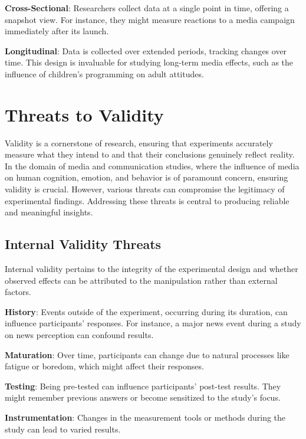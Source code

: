 \documentclass[
  b5paper]{book}
\begin{document}
\textbf{Cross-Sectional}: Researchers collect data at a single point in time, offering a snapshot view. For instance, they might measure reactions to a media campaign immediately after its launch.

\textbf{Longitudinal}: Data is collected over extended periods, tracking changes over time. This design is invaluable for studying long-term media effects, such as the influence of children's programming on adult attitudes.

\hypertarget{threats-to-validity}{%
\section{Threats to Validity}\label{threats-to-validity}}

Validity is a cornerstone of research, ensuring that experiments accurately measure what they intend to and that their conclusions genuinely reflect reality. In the domain of media and communication studies, where the influence of media on human cognition, emotion, and behavior is of paramount concern, ensuring validity is crucial. However, various threats can compromise the legitimacy of experimental findings. Addressing these threats is central to producing reliable and meaningful insights.

\hypertarget{internal-validity-threats}{%
\subsection*{Internal Validity Threats}\label{internal-validity-threats}}

Internal validity pertains to the integrity of the experimental design and whether observed effects can be attributed to the manipulation rather than external factors.

\textbf{History}: Events outside of the experiment, occurring during its duration, can influence participants' responses. For instance, a major news event during a study on news perception can confound results.

\textbf{Maturation}: Over time, participants can change due to natural processes like fatigue or boredom, which might affect their responses.

\textbf{Testing}: Being pre-tested can influence participants' post-test results. They might remember previous answers or become sensitized to the study's focus.

\textbf{Instrumentation}: Changes in the measurement tools or methods during the study can lead to varied results.
\end{document}
